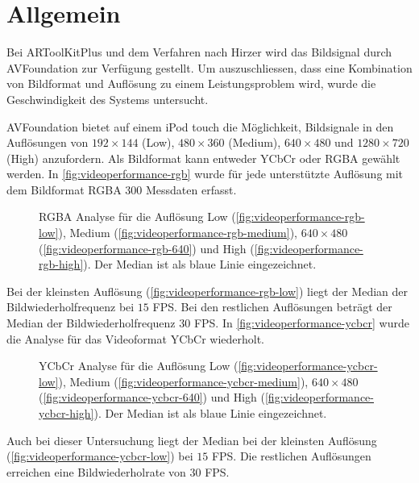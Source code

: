\section{Allgemein} %
\label{sec:allgemein}

Bei ARToolKitPlus und dem Verfahren nach Hirzer wird das Bildsignal durch AVFoundation zur Verfügung gestellt. Um
 auszuschliessen, dass eine Kombination von Bildformat und Auflösung zu einem Leistungsproblem wird, wurde die
 Geschwindigkeit des Systems untersucht.

AVFoundation bietet auf einem iPod touch die Möglichkeit, Bildsignale in den Auflösungen von $192 \times 144$ (Low),
 $480 \times 360$ (Medium), $640 \times 480$ und $1280 \times 720$ (High) anzufordern. Als Bildformat kann entweder
 YCbCr oder RGBA gewählt werden. In \autoref{fig:videoperformance-rgb} wurde für jede unterstützte
 Auflösung mit dem Bildformat RGBA $300$ Messdaten erfasst.
\begin{figure}[!ht]
	\centering
	\caption{RGBA Analyse für die Auflösung Low (\autoref{fig:videoperformance-rgb-low}),
	 Medium (\autoref{fig:videoperformance-rgb-medium}), $640 \times 480$ (\autoref{fig:videoperformance-rgb-640}) und
	 High (\autoref{fig:videoperformance-rgb-high}). Der Median ist als blaue Linie eingezeichnet.}
	\label{fig:videoperformance-rgb}
\end{figure}
Bei der kleinsten Auflösung (\autoref{fig:videoperformance-rgb-low}) liegt der Median der Bildwiederholfrequenz bei $15$
 FPS. Bei den restlichen Auflösungen beträgt der Median der Bildwiederholfrequenz $30$ FPS. In
 \autoref{fig:videoperformance-ycbcr} wurde die Analyse für das Videoformat YCbCr wiederholt.
\begin{figure}[!hm]
	\centering
	\caption{YCbCr Analyse für die Auflösung Low (\autoref{fig:videoperformance-ycbcr-low}),
	 Medium (\autoref{fig:videoperformance-ycbcr-medium}), $640 \times 480$ (\autoref{fig:videoperformance-ycbcr-640})
	 und High (\autoref{fig:videoperformance-ycbcr-high}). Der Median ist als blaue Linie eingezeichnet.}
	\label{fig:videoperformance-ycbcr}
\end{figure}
Auch bei dieser Untersuchung liegt der Median bei der kleinsten Auflösung (\autoref{fig:videoperformance-ycbcr-low})
 bei $15$ FPS. Die restlichen Auflösungen erreichen eine Bildwiederholrate von $30$ FPS.


